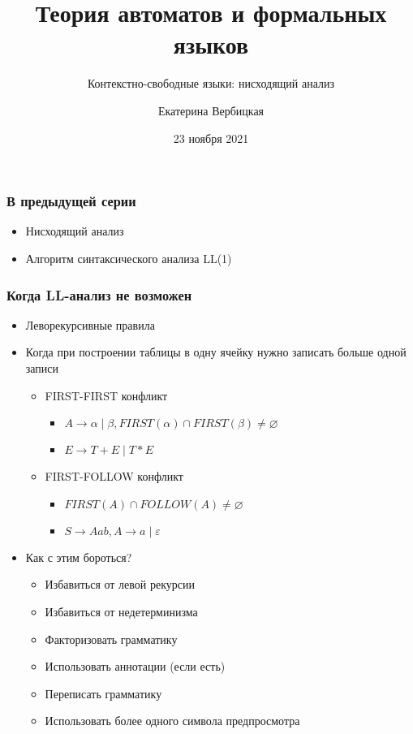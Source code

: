 \documentclass{beamer}
\title[]{Теория автоматов и формальных языков}
\subtitle[]{Контекстно-свободные языки: нисходящий анализ}
\institute[]{
Санкт-Петербургский государственный электротехнический университет <<ЛЭТИ>>\\
}
\author[]{Екатерина Вербицкая}
\date{23 ноября 2021}
\begin{document}
{
  \begin{frame}
    \titlepage
  \end{frame}
}


\begin{frame}[fragile]
  \transwipe[direction=90]
  \frametitle{В предыдущей серии}
  \begin{itemize}
    \item Нисходящий анализ
    \item Алгоритм синтаксического анализа LL(1)
  \end{itemize}
\end{frame}

\begin{frame}[fragile]
  \transwipe[direction=90]
  \frametitle{Когда LL-анализ не возможен}
\begin{itemize}
  \item Леворекурсивные правила
  \item Когда при построении таблицы в одну ячейку нужно записать
  больше одной записи
  \begin{itemize}
    \item FIRST-FIRST конфликт
    \begin{itemize}
      \item $A \to \alpha \mid \beta, FIRST(\alpha) \cap FIRST(\beta) \neq \varnothing$
      \item $E \to T + E \mid T * E$
    \end{itemize}
    \item FIRST-FOLLOW конфликт
    \begin{itemize}
      \item $FIRST(A) \cap FOLLOW (A) \neq \varnothing$
      \item $S \to Aab, A \to a \mid \varepsilon$
    \end{itemize}
  \end{itemize}
  \item Как с этим бороться?
  \begin{itemize}
    \item Избавиться от левой рекурсии
    \item Избавиться от недетерминизма
    \item Факторизовать грамматику
    \item Использовать аннотации (если есть)
    \item Переписать грамматику
    \item Использовать более одного символа предпросмотра
  \end{itemize}
\end{itemize}
\end{frame}
\end{document}
